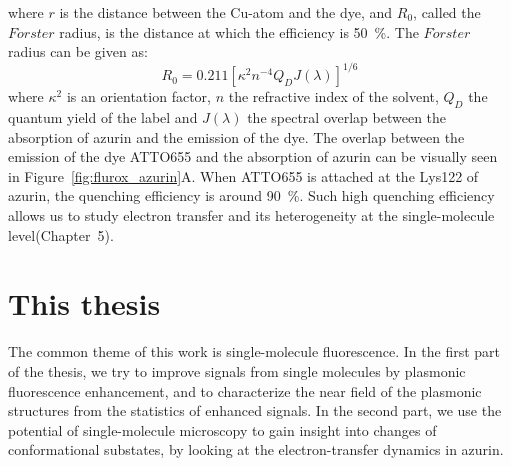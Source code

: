 where $r$ is the distance between the Cu-atom and the dye, and $R_0$, called the $F\ddot{o}rster$ radius, is the distance at which the efficiency is \SI{50}{\percent}.
The $F\ddot{o}rster$ radius can be given as:
\begin{equation}
	R_0 = 0.211[\kappa^2n^{-4}Q_DJ(\lambda)]^{1/6}	
\end{equation}
where $\kappa^2$ is an orientation factor, $n$ the refractive index of the solvent, $Q_D$ the quantum yield of the label and $J(\lambda)$ the spectral overlap between the absorption of azurin and the emission of the dye.
The overlap between the emission of the dye ATTO655 and the absorption of azurin can be visually seen in Figure~\ref{fig:flurox_azurin}A.
When ATTO655 is attached at the Lys122 of azurin, the quenching efficiency is around \SI{90}{\percent}.
Such high quenching efficiency allows us to study electron transfer and its heterogeneity at the single-molecule level(Chapter~5).

\section{This thesis}
The common theme of this work is single-molecule fluorescence. In the first part of the thesis, we try to improve signals from single molecules by plasmonic fluorescence enhancement, and to characterize the near field of the plasmonic structures from the statistics of enhanced signals. In the second part, we use the potential of single-molecule microscopy to gain insight into changes of conformational substates, by looking at the electron-transfer dynamics in azurin.

